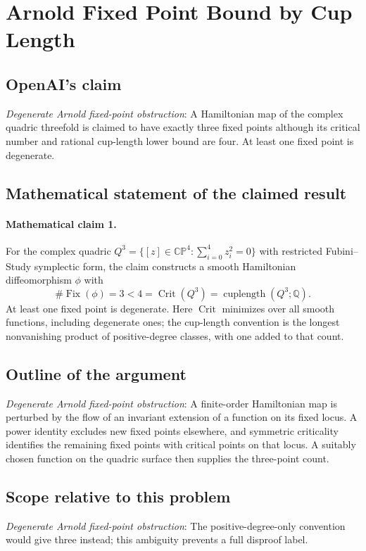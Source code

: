 \documentclass[11pt]{article}
\begin{document}
\section*{Arnold Fixed Point Bound by Cup Length}

\subsection{OpenAI's claim}
\textit{Degenerate Arnold fixed-point obstruction}: A Hamiltonian map of the complex quadric threefold is claimed to have exactly three fixed points although its critical number and rational cup-length lower bound are four. At least one fixed point is degenerate.

\subsection{Mathematical statement of the claimed result}
\paragraph{Mathematical claim 1.} For the complex quadric $Q^3=\{[z]\in\mathbb{CP}^4:\sum_{i=0}^4z_i^2=0\}$ with restricted Fubini--Study symplectic form, the claim constructs a smooth Hamiltonian diffeomorphism $\phi$ with \[\#\operatorname{Fix}(\phi)=3<4=\operatorname{Crit}(Q^3)=\operatorname{cuplength}(Q^3;\mathbb Q).\] At least one fixed point is degenerate. Here $\operatorname{Crit}$ minimizes over all smooth functions, including degenerate ones; the cup-length convention is the longest nonvanishing product of positive-degree classes, with one added to that count.

\subsection{Outline of the argument}
\textit{Degenerate Arnold fixed-point obstruction}: A finite-order Hamiltonian map is perturbed by the flow of an invariant extension of a function on its fixed locus. A power identity excludes new fixed points elsewhere, and symmetric criticality identifies the remaining fixed points with critical points on that locus. A suitably chosen function on the quadric surface then supplies the three-point count.

\subsection{Scope relative to this problem}
\textit{Degenerate Arnold fixed-point obstruction}: The positive-degree-only convention would give three instead; this ambiguity prevents a full disproof label.
\end{document}
